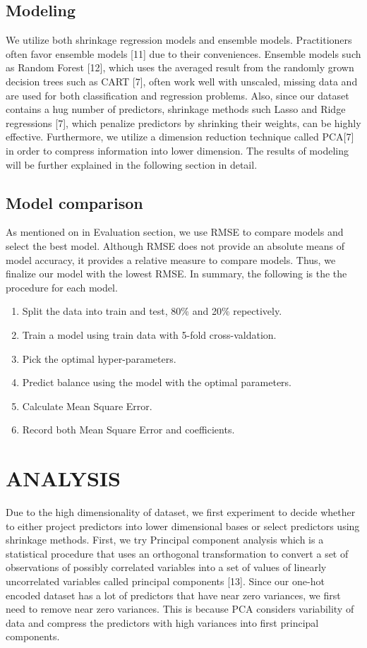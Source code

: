 \documentclass[letterpaper, 10 pt, conference]{ieeeconf}\usepackage[]{graphicx}\usepackage[]{color}
\begin{document}
\subsection{Modeling}
We utilize both shrinkage regression models and ensemble models. Practitioners often favor ensemble models [11] due to their conveniences. Ensemble models such as Random Forest [12], which uses the averaged result from the randomly grown decision trees such as CART [7], often work well with unscaled, missing data and are used for both classification and regression problems. Also, since our dataset contains a hug number of predictors, shrinkage methods such Lasso and Ridge regressions [7], which penalize predictors by shrinking their weights, can be highly effective. Furthermore, we utilize a dimension reduction technique called PCA[7] in order to compress information into lower dimension. The results of modeling will be further explained in the following section in detail.

\subsection{Model comparison}
As mentioned on in Evaluation section, we use RMSE to compare models and select the best model. Although RMSE does not provide an absolute means of model accuracy, it provides a relative measure to compare models. Thus, we finalize our model with the lowest RMSE.
In summary, the following is the the procedure for each model.

\begin{enumerate}
\item Split the data into train and test, 80\% and 20\% repectively.
\item Train a model using train data with 5-fold cross-valdation.
\item Pick the optimal hyper-parameters.
\item Predict balance using the model with the optimal parameters.
\item Calculate Mean Square Error.
\item Record both Mean Square Error and coefficients.
\end{enumerate}

\section{ANALYSIS}
Due to the high dimensionality of dataset, we first experiment to decide whether to either project predictors into lower dimensional bases or select predictors using shrinkage methods. First, we try Principal component analysis which is a statistical procedure that uses an orthogonal transformation to convert a set of observations of possibly correlated variables into a set of values of linearly uncorrelated variables called principal components [13]. Since our one-hot encoded dataset has a lot of predictors that have near zero variances, we first need to remove near zero variances. This is because PCA considers variability of data and compress the predictors with high variances into first principal components.   
\end{document}
